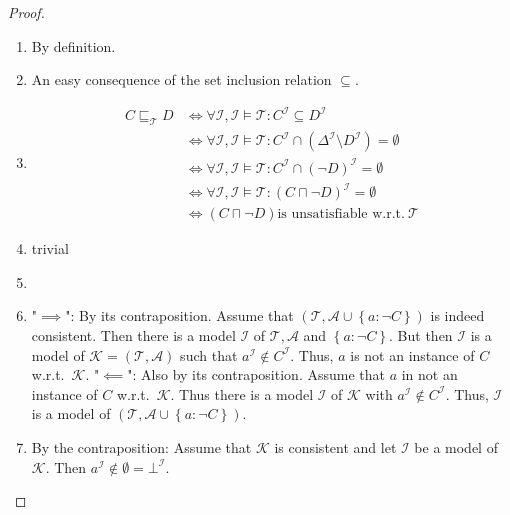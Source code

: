\begin{proof}
	\begin{enumerate}
		\item By definition.
		\item An easy consequence of the set inclusion relation $\subseteq$.
		\item
			\begin{align*}
				C \sqsubseteq_{\mathcal{T}} D & \iff \forall \mathcal{I}, \mathcal{I} \vDash \mathcal{T}: C^{\mathcal{I}} \subseteq D^{\mathcal{I}}\\
											  & \iff \forall \mathcal{I}, \mathcal{I} \vDash \mathcal{T} : C^\mathcal{I} \cap (\Delta^{\mathcal{I}} \setminus D^{\mathcal{I}}) = \emptyset\\
											  & \iff \forall \mathcal{I}, \mathcal{I} \vDash \mathcal{T}: C^{\mathcal{I}} \cap (\neg D)^\mathcal{I} = \emptyset\\
											  & \iff \forall \mathcal{I}, \mathcal{I} \vDash \mathcal{T}: \left( C \sqcap \neg D \right)^\mathcal{I} = \emptyset\\
											  & \iff \left( C \sqcap \neg D \right) \text{is unsatisfiable w.r.t.}\ \mathcal{T} 
			\end{align*}
		\item trivial 
		\item
		\item "$ \implies$": By its contraposition. \newline
			Assume that $\left( \mathcal{T}, \mathcal{A} \cup \left\{a: \neg C \right\} \right)$ is indeed consistent.
			Then there is  a model $\mathcal{I}$ of $\mathcal{T} , \mathcal{A}$ and $\left\{ a: \neg C \right\}$.
			But then $\mathcal{I}$ is a model of $\mathcal{K} = \left( \mathcal{T}, \mathcal{A} \right)$ such that
			$a^{\mathcal{I}} \notin C^\mathcal{I}$.
			Thus, $a$ is not an instance of $C$ w.r.t.\ $\mathcal{K}$. \newline
			"$\impliedby$": Also by its contraposition. \newline
			Assume that $a$ in not an instance of $C$ w.r.t.\ $\mathcal{K}$.
			Thus there is a model $\mathcal{I}$ of $\mathcal{K}$ with $a^\mathcal{I} \notin C^\mathcal{I}$.
			Thus, $\mathcal{I}$ is a model of $\left( \mathcal{T}, \mathcal{A} \cup \left\{ a: \neg C \right\} \right)$.
		\item By the contraposition: \newline
			Assume that $\mathcal{K}$ is consistent and let $\mathcal{I}$ be a model of $\mathcal{K}$.
			Then $a^\mathcal{I} \notin \emptyset = \bot^\mathcal{I}$.

\end{enumerate}
\end{proof}
